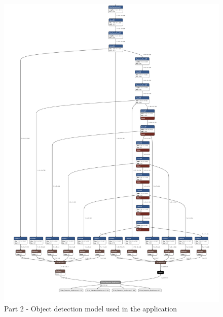 \begin{figure}
    \centering
    \includegraphics[width=\textwidth]{figure/detect.tflite_2.png}
    \caption{Part 2 - Object detection model used in the application}
    \label{Apend:object_detect_model_2}
\end{figure}
